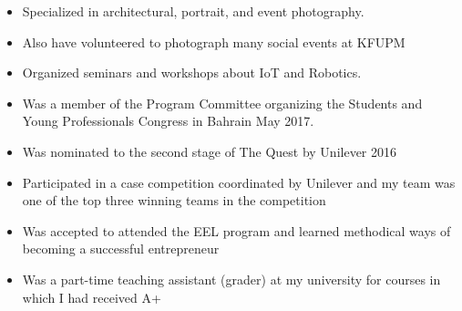 \documentclass[10pt,a4paper]{altacv}
\begin{document}



\clearpage
{}

\begin{itemize}
\item Specialized in architectural, portrait, and event photography.
\item Also have volunteered to photograph many social events at KFUPM
\end{itemize}

\divider

\begin{itemize}
\item Organized seminars and workshops about IoT and Robotics.
\item Was a member of the Program Committee organizing the Students and Young Professionals Congress in Bahrain May 2017.
\end{itemize}

\divider

\begin{itemize}
\item Was nominated to the second stage of The Quest by Unilever 2016 
\item Participated in a case competition coordinated by Unilever and my team was one of the top three winning teams in the competition 
\end{itemize}

\divider

\begin{itemize}
\item Was accepted to attended the EEL program and learned methodical ways of becoming  a successful entrepreneur
\end{itemize}

\divider

\begin{itemize}
\item Was a part-time teaching assistant (grader) at my university for courses in which I had received A+ 
\end{itemize}
\end{document}
